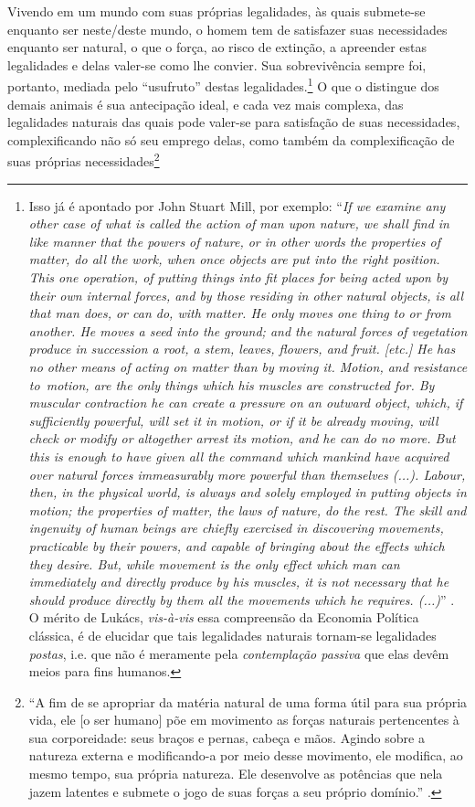 Vivendo em um mundo com suas próprias legalidades, às quais submete-se enquanto ser neste/deste mundo, o homem tem de satisfazer suas necessidades enquanto ser natural, o que o força, ao risco de extinção, a apreender estas legalidades e delas valer-se como lhe convier. Sua sobrevivência sempre foi, portanto, mediada pelo ``usufruto'' destas legalidades.\footnote{Isso já é apontado por John Stuart Mill, por exemplo: ``\textit{If we examine any other case of what is called the action of man upon nature, we shall find in like manner that the powers of nature, or in other words the properties of matter, do all the work, when once objects are put into the right position. This one operation, of putting things into fit places for being acted upon by their own internal forces, and by those residing in other natural objects, is all that man does, or can do, with matter. He only moves one thing to or from another. He moves a seed into the ground; and the natural forces of vegetation produce in succession a root, a stem, leaves, flowers, and fruit. [etc.] He has no other means of acting on matter than by moving it. Motion, and resistance to motion, are the only things which his muscles are constructed for. By muscular contraction he can create a pressure on an outward object, which, if sufficiently powerful, will set it in motion, or if it be already moving, will check or modify or altogether arrest its motion, and he can do no more. But this is enough to have given all the command which mankind have acquired over natural forces immeasurably more powerful than themselves (...). Labour, then, in the physical world, is always and solely employed in putting objects in motion; the properties of matter, the laws of nature, do the rest. The skill and ingenuity of human beings are chiefly exercised in discovering movements, practicable by their powers, and capable of bringing about the effects which they desire. But, while movement is the only effect which man can immediately and directly produce by his muscles, it is not necessary that he should produce directly by them all the movements which he requires. (...)}'' \parencite[p. 48]{Mill1909}. O mérito de Lukács, \textit{vis-à-vis} essa compreensão da Economia Política clássica, é de elucidar que tais legalidades naturais tornam-se legalidades \textit{postas}, i.e. que não é meramente pela \textit{contemplação passiva} que elas devêm meios para fins humanos.} O que o distingue dos demais animais é sua antecipação ideal, e cada vez mais complexa, das legalidades naturais das quais pode valer-se para satisfação de suas necessidades, complexificando não só seu emprego delas, como também da complexificação de suas próprias necessidades\footnote{``A fim de se apropriar da matéria natural de uma forma útil para sua própria vida, ele [o ser humano] põe em movimento as forças naturais pertencentes à sua corporeidade: seus braços e pernas, cabeça e mãos. Agindo sobre a natureza externa e modificando-a por meio desse movimento, ele modifica, ao mesmo tempo, sua própria natureza. Ele desenvolve as potências que nela jazem latentes e submete o jogo de suas forças a seu próprio domínio.'' \parencite[p. 255]{Marx2017}.}

